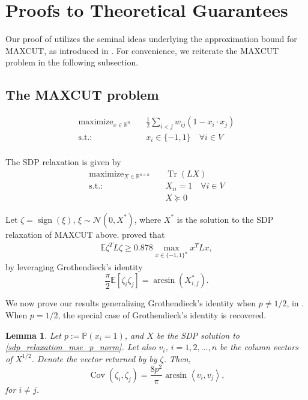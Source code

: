 \documentclass[12pt]{article}
\newtheorem{lemma}[theorem]{Lemma}
\theoremstyle{definition}
\numberwithin{equation}{section}
\numberwithin{figure}{section}
\newcommand{\maximize}{\mathop{\mathrm{maximize}}}
\newcommand\dotp[1]{\left\langle #1 \right\rangle}
\newcommand{\cov}{\operatorname{Cov}}
\newcommand{\calN}{{\mathcal N}}
\numberwithin{equation}{section}
\numberwithin{figure}{section}
\begin{document}
\section{Proofs to Theoretical Guarantees}
\label{proof:thm_approximation_error}

Our proof of  utilizes the seminal ideas underlying the approximation bound for MAXCUT, as introduced in \citet{goemans1995improved}. For convenience, we reiterate the MAXCUT problem in the following subsection.

\subsection{The MAXCUT problem} \label{maxcut_context}
\begin{align*}
    \maximize_{x \in \mathbb{R}^n} \quad & \frac{1}{2} \sum_{i < j} w_{ij} (1 - x_i \cdot x_j) \\
    \text{s.t.:} \quad & x_i \in \{ -1, 1 \} \quad \forall i \in V \\
\end{align*}

The SDP relaxation is given by
\begin{align*}
    \maximize_{X \in \mathbb{R}^{n \times n}} \quad & \operatorname{Tr}(L X) \\
    \text{s.t.:} \quad & X_{ii} = 1 \quad \forall i \in V \\
    &  X \succeq 0
\end{align*}

Let $\zeta = \operatorname{sign}(\xi)$, $\xi \sim \calN(0, X^*)$, where $X^*$ is the solution to the SDP relaxation of MAXCUT above. \citet{goemans1995improved} proved that 
\begin{align*}
    \mathbb{E} \zeta^T L \zeta \geq 0.878 \max_{x \in \{-1,1 \}^n} x^T L x,
\end{align*} by leveraging Grothendieck's identity $$\frac{\pi}{2}\mathbb{E}[\zeta_i \zeta_j] = \arcsin(X_{i,j}^*).$$

We now prove our results generalizing Grothendieck's identity when $p \neq 1/2$, in . When $p = 1/2$, the special case of Grothendieck's identity is recovered.

\begin{lemma} \label{non_symmetric_rounding_cov}
    Let $p:= \mathbb{P}(x_i  = 1)$, and $X$ be the SDP solution to \ref{sdp_relaxation_mse_p_norm}. Let also $v_i$, $i=1,2, \ldots, n$ be the column vectors of $X^{1/2}$. Denote the vector returned by  by $\zeta$. Then,
    \[\cov(\zeta_i, \zeta_j) = \frac{8p^2}{\pi} \arcsin{\dotp{v_i, v_j}},\] for $i \neq j$.
\end{lemma}
\end{document}
